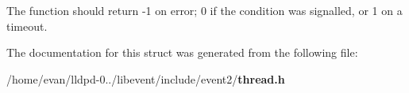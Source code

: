 \-The function should return -\/1 on error; 0 if the condition was signalled, or 1 on a timeout. 

\-The documentation for this struct was generated from the following file\-:\begin{DoxyCompactItemize}
\item 
/home/evan/lldpd-\/0../libevent/include/event2/{\bf thread.\-h}\end{DoxyCompactItemize}

